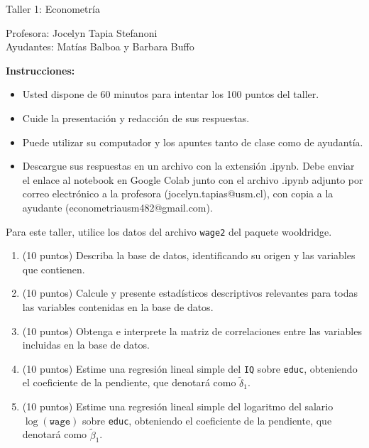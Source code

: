 \documentclass{article} %
\begin{document}
{\fontsize{30pt}{36pt}\selectfont

\begin{center}
    Taller 1: Econometría 

Profesora:    Jocelyn Tapia Stefanoni\\
Ayudantes:   Matías Balboa y   Barbara Buffo
\end{center}



\textbf{Instrucciones:} 

\begin{itemize}
    \item Usted dispone de 60 minutos  para intentar los 100 puntos del taller.
    \item Cuide la presentación y redacción de sus respuestas.
    \item Puede utilizar su computador y los apuntes tanto de clase como de ayudantía.
    \item Descargue sus respuestas en un archivo con la extensión .ipynb. Debe enviar el enlace al notebook en Google Colab junto con el archivo .ipynb adjunto por correo electrónico a la profesora (jocelyn.tapias@usm.cl), con copia a la ayudante (econometriausm482@gmail.com). 
    \end{itemize}

    Para este taller, utilice los datos del archivo \texttt{wage2} del paquete wooldridge. 


\begin{enumerate}
\item (10 puntos) Describa la base de datos, identificando su origen y las variables que contienen. 
    \item (10 puntos) Calcule y presente estadísticos descriptivos relevantes para todas las variables contenidas en la base de datos.

\item (10 puntos) Obtenga e interprete la matriz de correlaciones entre las variables incluidas en la base de datos.

\item (10 puntos) Estime una regresión lineal simple del \texttt{IQ} sobre \texttt{educ}, obteniendo el coeficiente de la pendiente, que denotará como $\tilde{\delta}_1$.

\item (10 puntos) Estime una regresión lineal simple del logaritmo del salario $\log(\texttt{wage})$ sobre \texttt{educ}, obteniendo el coeficiente de la pendiente, que denotará como $\tilde{\beta}_1$.


\end{enumerate}}
\end{document}
